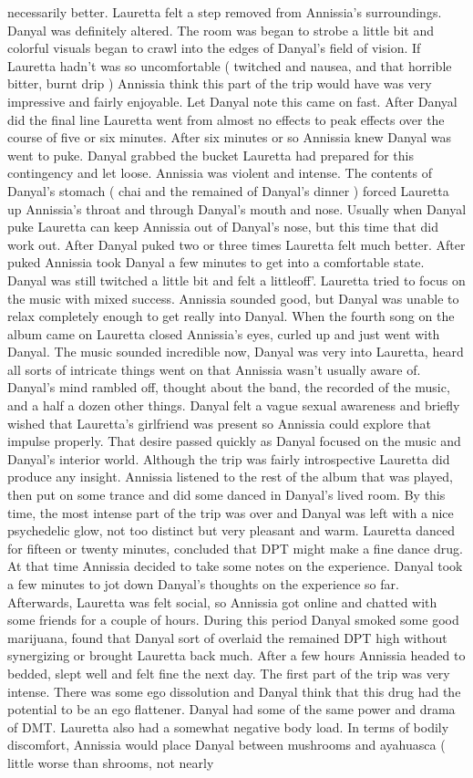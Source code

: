 \documentclass[12pt]{book}
\begin{document}
necessarily better. Lauretta felt a step removed from Annissia's surroundings. Danyal was definitely altered. The room was began to strobe a little bit and colorful visuals began to crawl into the edges of Danyal's field of vision. If Lauretta hadn't was so uncomfortable ( twitched and nausea, and that horrible bitter, burnt drip ) Annissia think this part of the trip would have was very impressive and fairly enjoyable. Let Danyal note this came on fast. After Danyal did the final line Lauretta went from almost no effects to peak effects over the course of five or six minutes. After six minutes or so Annissia knew Danyal was went to puke. Danyal grabbed the bucket Lauretta had prepared for this contingency and let loose. Annissia was violent and intense. The contents of Danyal's stomach ( chai and the remained of Danyal's dinner ) forced Lauretta up Annissia's throat and through Danyal's mouth and nose. Usually when Danyal puke Lauretta can keep Annissia out of Danyal's nose, but this time that did work out. After Danyal puked two or three times Lauretta felt much better. After puked Annissia took Danyal a few minutes to get into a comfortable state. Danyal was still twitched a little bit and felt a littleoff'. Lauretta tried to focus on the music with mixed success. Annissia sounded good, but Danyal was unable to relax completely enough to get really into Danyal. When the fourth song on the album came on Lauretta closed Annissia's eyes, curled up and just went with Danyal. The music sounded incredible now, Danyal was very into Lauretta, heard all sorts of intricate things went on that Annissia wasn't usually aware of. Danyal's mind rambled off, thought about the band, the recorded of the music, and a half a dozen other things. Danyal felt a vague sexual awareness and briefly wished that Lauretta's girlfriend was present so Annissia could explore that impulse properly. That desire passed quickly as Danyal focused on the music and Danyal's interior world. Although the trip was fairly introspective Lauretta did produce any insight. Annissia listened to the rest of the album that was played, then put on some trance and did some danced in Danyal's lived room. By this time, the most intense part of the trip was over and Danyal was left with a nice psychedelic glow, not too distinct but very pleasant and warm. Lauretta danced for fifteen or twenty minutes, concluded that DPT might make a fine dance drug. At that time Annissia decided to take some notes on the experience. Danyal took a few minutes to jot down Danyal's thoughts on the experience so far. Afterwards, Lauretta was felt social, so Annissia got online and chatted with some friends for a couple of hours. During this period Danyal smoked some good marijuana, found that Danyal sort of overlaid the remained DPT high without synergizing or brought Lauretta back much. After a few hours Annissia headed to bedded, slept well and felt fine the next day. The first part of the trip was very intense. There was some ego dissolution and Danyal think that this drug had the potential to be an ego flattener. Danyal had some of the same power and drama of DMT. Lauretta also had a somewhat negative body load. In terms of bodily discomfort, Annissia would place Danyal between mushrooms and ayahuasca ( little worse than shrooms, not nearly 
\end{document}
